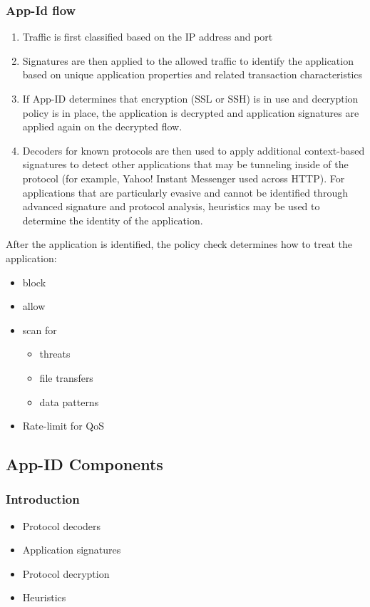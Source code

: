 \subsubsection{App-Id flow}
    \begin{enumerate}
        \item Traffic is first classified based on the IP address and port
        \item Signatures are then applied to the allowed traffic to identify the application based on unique application properties and related transaction characteristics
        \item If App-ID determines that encryption (SSL or SSH) is in use and decryption policy is in place, the application is decrypted and application signatures are applied again on the decrypted flow.
        \item Decoders for known protocols are then used to apply additional context-based signatures to detect other applications that may be tunneling inside of the protocol (for example, Yahoo! Instant Messenger used across HTTP). For applications that are particularly evasive and cannot be identified through advanced signature and protocol analysis, heuristics may be used to determine the identity of the application.
    \end{enumerate}
After the application is identified, the policy check determines how to treat the application:
    \begin{itemize}
        \item block
        \item allow
        \item scan for
            \begin{itemize}
                \item threats
                \item file transfers
                \item data patterns
            \end{itemize}
        \item Rate-limit for QoS
    \end{itemize}

\subsection{App-ID Components}
\subsubsection{Introduction}
    \begin{itemize}
        \item Protocol decoders
        \item Application signatures
        \item Protocol decryption
        \item Heuristics
    \end{itemize}
    
